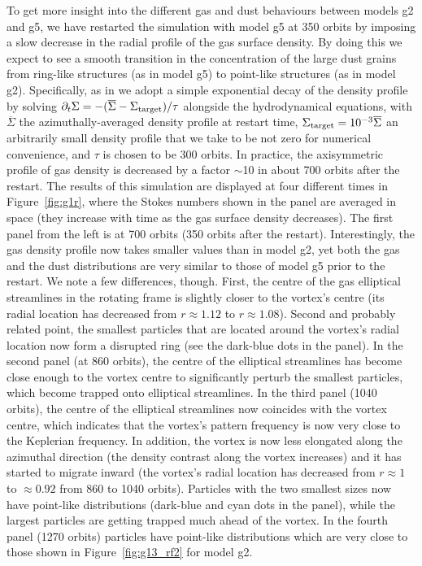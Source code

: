 \documentclass[a4paper,usenatbib]{mnras}
\begin{document}
To get more insight into the different gas and dust behaviours between
models g2 and g5, we have restarted the simulation with model g5 at
350 orbits by imposing a slow decrease in the radial profile of the
gas surface density. By doing this we expect to see a smooth
transition in the concentration of the large dust grains from
ring-like structures (as in model g5) to point-like structures (as in
model g2). Specifically, as in \cite{BP13} we adopt a simple
exponential decay of the density profile by solving $\partial_t \Sigma
= -(\overline{\Sigma} - \Sigma_{\rm target})/\tau$ alongside the
hydrodynamical equations, with $\overline{\Sigma}$ the
azimuthally-averaged density profile at restart time, $\Sigma_{\rm
  target} = 10^{-3}\overline{\Sigma}$ an arbitrarily small density
profile that we take to be not zero for numerical convenience, and
$\tau$ is chosen to be 300 orbits. In practice, the axisymmetric
profile of gas density is decreased by a factor $\sim$10 in about 700
orbits after the restart. The results of this simulation are displayed
at four different times in Figure~\ref{fig:g1r}, where the Stokes
numbers shown in the panel are averaged in space (they increase with
time as the gas surface density decreases). The first panel from the
left is at 700 orbits (350 orbits after the restart).  Interestingly,
the gas density profile now takes smaller values than in model g2, yet
both the gas and the dust distributions are very similar to those of
model g5 prior to the restart. We note a few differences, though.
First, the centre of the gas elliptical streamlines in the rotating
frame is slightly closer to the vortex's centre (its radial location
has decreased from $r \approx 1.12$ to $r \approx 1.08$). Second and
probably related point, the smallest particles that are located around
the vortex's radial location now form a disrupted ring (see the
dark-blue dots in the panel). In the second panel (at 860 orbits), the
centre of the elliptical streamlines has become close enough to the
vortex centre to significantly perturb the smallest particles, which
become trapped onto elliptical streamlines. In the third panel (1040
orbits), the centre of the elliptical streamlines now coincides with
the vortex centre, which indicates that the vortex's pattern frequency
is now very close to the Keplerian frequency.  In addition, the vortex
is now less elongated along the azimuthal direction (the density
contrast along the vortex increases) and it has started to migrate
inward (the vortex's radial location has decreased from $r \approx 1$
to $\approx 0.92$ from 860 to 1040 orbits). Particles with the two
smallest sizes now have point-like distributions (dark-blue and cyan
dots in the panel), while the largest particles are getting trapped
much ahead of the vortex. In the fourth panel (1270 orbits) particles
have point-like distributions which are very close to those shown in
Figure~\ref{fig:g13_rf2} for model g2.
\end{document}
